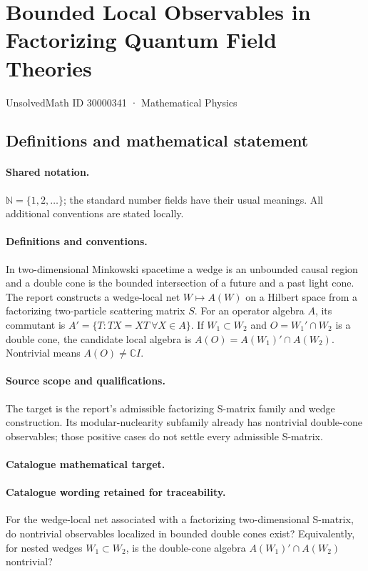 \documentclass[11pt]{article}
\begin{document}
\setcounter{section}{30000340}
\section{Bounded Local Observables in Factorizing Quantum Field Theories}\label{30000341}
{\small UnsolvedMath ID 30000341 · Mathematical Physics}
\subsection{Definitions and mathematical statement}

\paragraph{Shared notation.}$\mathbb N=\{1,2,\ldots\}$; the standard number fields have their usual meanings. All additional conventions are stated locally.


\paragraph{Definitions and conventions.} In two-dimensional Minkowski spacetime a wedge is an unbounded causal region and a double cone is the bounded intersection of a future and a past light cone. The report constructs a wedge-local net $W\mapsto A(W)$ on a Hilbert space from a factorizing two-particle scattering matrix $S$. For an operator algebra $A$, its commutant is $A'=\{T:TX=XT\ \forall X\in A\}$. If $W_1\subset W_2$ and $O=W_1'\cap W_2$ is a double cone, the candidate local algebra is $A(O)=A(W_1)'\cap A(W_2)$. Nontrivial means $A(O)\ne\mathbb C I$.

\paragraph{Source scope and qualifications.} The target is the report's admissible factorizing S-matrix family and wedge construction. Its modular-nuclearity subfamily already has nontrivial double-cone observables; those positive cases do not settle every admissible S-matrix.

\paragraph{Catalogue mathematical target.}
\paragraph{Catalogue wording retained for traceability.}
For the wedge-local net associated with a factorizing two-dimensional S-matrix, do nontrivial observables localized in bounded double cones exist? Equivalently, for nested wedges $W_1\subset W_2$, is the double-cone algebra $A(W_1)'\cap A(W_2)$ nontrivial?
\end{document}
